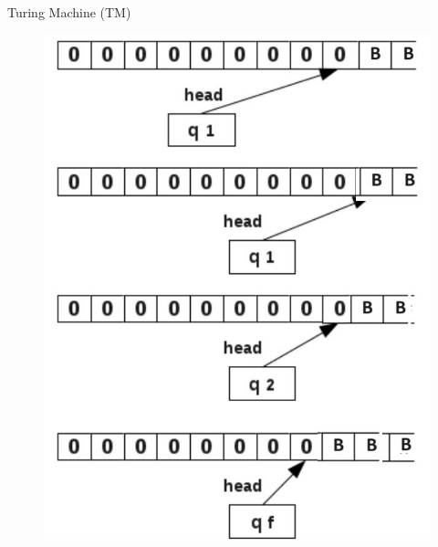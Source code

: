 \documentclass{beamer}
\begin{document}
\begin{frame}{Turing Machine (TM)} 
	\begin{figure}
		\includegraphics[scale=.4]{img5/m12}
	\end{figure}
\end{frame}	
\end{document}

